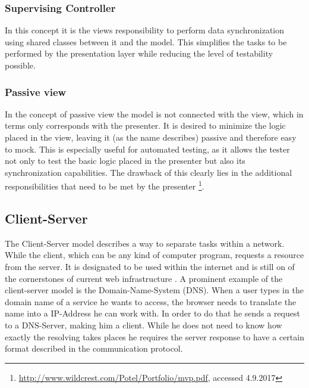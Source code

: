 \subsubsection{Supervising Controller}
In this concept it is the views responsibility to perform data synchronization using shared classes between it and the model. This simplifies the tasks to be performed by the presentation layer while reducing the level of testability possible. 
\subsubsection{Passive view}
In the concept of passive view the model is not connected with the view, which in terms only corresponds with the presenter. It is desired to minimize the logic placed in the view, leaving it (as the name describes) passive and therefore easy to mock. This is especially useful for automated testing, as it allows the tester not only to test the basic logic placed in the presenter but also its synchronization capabilities. The drawback of this clearly lies in the additional responsibilities that need to be met by the presenter \footnote{\href{http://www.wildcrest.com/Potel/Portfolio/mvp.pdf}{http://www.wildcrest.com/Potel/Portfolio/mvp.pdf}, accessed 4.9.2017}.


\subsection{Client-Server}
The Client-Server model describes a way to separate tasks within a network. While the client, which can be any kind of computer program, requests a resource from the server. It is designated to be used within the internet and is still on of the cornerstones of current web infrastructure \cite[p. 3ff]{server} . A prominent example of the client-server model is the Domain-Name-System (DNS). When a user types in the domain name of a service he wants to access, the browser needs to translate the name into a IP-Address he can work with. In order to do that he sends a request to a DNS-Server, making him a client. While he does not need to know how exactly the resolving takes places he requires the server response to have a certain format described in the communication protocol. 

